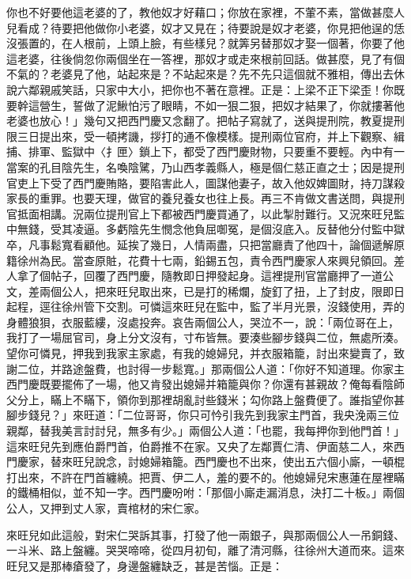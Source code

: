 你也不好要他這老婆的了，教他奴才好藉口；你放在家裡，不葷不素，當做甚麼人兒看成？待要把他做你小老婆，奴才又見在；待要說是奴才老婆，你見把他逞的恁沒張置的，在人根前，上頭上臉，有些樣兒？就筭另替那奴才娶一個著，你要了他這老婆，往後倘忽你兩個坐在一答裡，那奴才或走來根前回話。做甚麼，見了有個不氣的？老婆見了他，站起來是？不站起來是？先不先只這個就不雅相，傳出去休說六鄰親戚笑話，只家中大小，把你也不著在意裡。正是：上梁不正下梁歪！你既要幹這營生，誓做了泥鰍怕污了眼睛，不如一狠二狠，把奴才結果了，你就摟著他老婆也放心！」幾句又把西門慶又念翻了。把帖子寫就了，送與提刑院，教夏提刑限三日提出來，受一頓拷譏，拶打的通不像模樣。提刑兩位官府，并上下觀察、緝捕、排軍、監獄中〈扌匣〉鎖上下，都受了西門慶財物，只要重不要輕。內中有一當案的孔目陰先生，名喚陰騭，乃山西孝義縣人，極是個仁慈正直之士；因是提刑官吏上下受了西門慶賄賂，要陷害此人，圖謀他妻子，故入他奴婢圖財，持刀謀殺家長的重罪。也要天理，做官的養兒養女也往上長。再三不肯做文書送問，與提刑官抵面相講。況兩位提刑官上下都被西門慶買通了，以此掣肘難行。又況來旺兒監中無錢，受其凌逼。多虧陰先生憫念他負屈啣冤，是個沒底入。反替他分付監中獄卒，凡事鬆寬看顧他。延挨了幾日，人情兩盡，只把當廳責了他四十，論個遞解原籍徐州為民。當查原賍，花費十七兩，鉛錫五包，責令西門慶家人來興兒領回。差人拿了個帖子，回覆了西門慶，隨教即日押發起身。這裡提刑官當廳押了一道公文，差兩個公人，把來旺兒取出來，已是打的稀爛，旋釘了扭，上了封皮，限即日起程，逕往徐州管下交割。可憐這來旺兒在監中，監了半月光景，沒錢使用，弄的身體狼狽，衣服藍縷，沒處投奔。哀告兩個公人，哭泣不一，說：「兩位哥在上，我打了一場屈官司，身上分文沒有，寸布皆無。要湊些腳步錢與二位，無處所湊。望你可憐見，押我到我家主家處，有我的媳婦兒，并衣服箱籠，討出來變賣了，致謝二位，并路途盤費，也討得一步鬆寬。」那兩個公人道：「你好不知道理。你家主西門慶既要擺佈了一場，他又肯發出媳婦并箱籠與你？你還有甚親故？俺每看陰師父分上，瞞上不瞞下，領你到那裡胡亂討些錢米；勾你路上盤費便了。誰指望你甚腳步錢兒？」來旺道：「二位哥哥，你只可忴引我先到我家主門首，我央浼兩三位親鄰，替我美言討討兒，無多有少。」兩個公人道：「也罷，我每押你到他門首！」這來旺兒先到應伯爵門首，伯爵推不在家。又央了左鄰賈仁清、伊面慈二人，來西門慶家，替來旺兒說念，討媳婦箱籠。西門慶也不出來，使出五六個小廝，一頓棍打出來，不許在門首纏繞。把賈、伊二人，羞的要不的。他媳婦兒宋惠蓮在屋裡瞞的鐵桶相似，並不知一字。西門慶吩咐：「那個小廝走漏消息，決打二十板。」兩個公人，又押到丈人家，賣棺材的宋仁家。

來旺兒如此這般，對宋仁哭訴其事，打發了他一兩銀子，與那兩個公人一吊銅錢、一斗米、路上盤纏。哭哭啼啼，從四月初旬，離了清河縣，往徐州大道而來。這來旺兒又是那棒瘡發了，身邊盤纏缺乏，甚是苦惱。正是：

